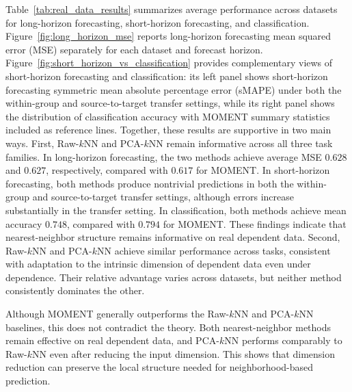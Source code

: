 \documentclass[12pt]{article}
\theoremstyle{definition}
\begin{document}
Table~\ref{tab:real_data_results} summarizes average performance across datasets for long-horizon forecasting, short-horizon forecasting, and classification. Figure~\ref{fig:long_horizon_mse} reports long-horizon forecasting mean squared error (MSE) separately for each dataset and forecast horizon. Figure~\ref{fig:short_horizon_vs_classification} provides complementary views of short-horizon forecasting and classification: its left panel shows short-horizon forecasting symmetric mean absolute percentage error (sMAPE) under both the within-group and source-to-target transfer settings, while its right panel shows the distribution of classification accuracy with MOMENT summary statistics included as reference lines. Together, these results are supportive in two main ways. First, Raw-$k$NN and PCA-$k$NN remain informative across all three task families. In long-horizon forecasting, the two methods achieve average MSE $0.628$ and $0.627$, respectively, compared with $0.617$ for MOMENT. In short-horizon forecasting, both methods produce nontrivial predictions in both the within-group and source-to-target transfer settings, although errors increase substantially in the transfer setting. In classification, both methods achieve mean accuracy $0.748$, compared with $0.794$ for MOMENT. These findings indicate that nearest-neighbor structure remains informative on real dependent data. Second, Raw-$k$NN and PCA-$k$NN achieve similar performance across tasks, consistent with adaptation to the intrinsic dimension of dependent data even under dependence. Their relative advantage varies across datasets, but neither method consistently dominates the other. 

Although MOMENT generally outperforms the Raw-$k$NN and PCA-$k$NN baselines, this does not contradict the theory. Both nearest-neighbor methods remain effective on real dependent data, and PCA-$k$NN performs comparably to Raw-$k$NN even after reducing the input dimension. This shows that dimension reduction can preserve the local structure needed for neighborhood-based prediction.
\end{document}
